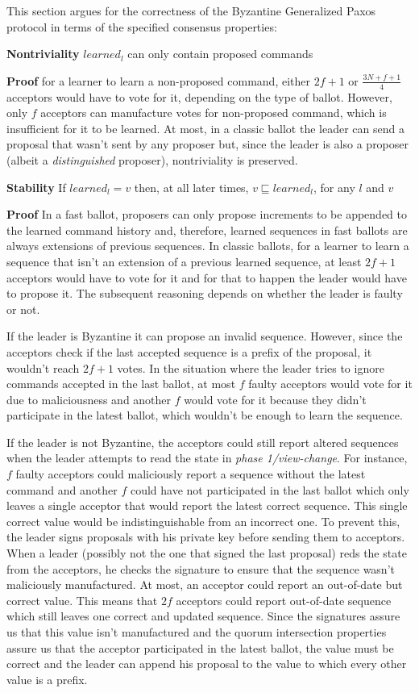 \newpage
This section argues for the correctness of the Byzantine Generalized Paxos protocol in terms of the specified consensus properties:\par

\textbf{Nontriviality} $learned_l$ can only contain proposed commands\par
\textbf{Proof} for a learner to learn a non-proposed command, either $2f+1$ or $\frac{3N+f+1}{4}$ acceptors would have to vote for it, depending on the type of ballot. However, only $f$ acceptors can manufacture votes for non-proposed command, which is insufficient for it to be learned. At most, in a classic ballot the leader can send a proposal that wasn't sent by any proposer but, since the leader is also a proposer (albeit a \textit{distinguished} proposer), nontriviality is preserved.\par

\textbf{Stability} If $learned_l = v$ then, at all later times, $v \sqsubseteq learned_l$, for any $l$ and $v$\par
\textbf{Proof} In a fast ballot, proposers can only propose increments to be appended to the learned command history and, therefore, learned sequences in fast ballots are always extensions of previous sequences. In classic ballots, for a learner to learn a sequence that isn't an extension of a previous learned sequence, at least $2f+1$ acceptors would have to vote for it and for that to happen the leader would have to propose it. The subsequent reasoning depends on whether the leader is faulty or not.\par
If the leader is Byzantine it can propose an invalid sequence. However, since the acceptors check if the last accepted sequence is a prefix of the proposal, it wouldn't reach $2f+1$ votes. In the situation where the leader tries to ignore commands accepted in the last ballot, at most $f$ faulty acceptors would vote for it due to maliciousness and another $f$ would vote for it because they didn't participate in the latest ballot, which wouldn't be enough to learn the sequence. \par
If the leader is not Byzantine, the acceptors could still report altered sequences when the leader attempts to read the state in \textit{phase 1/view-change}. For instance, $f$ faulty acceptors could maliciously report a sequence without the latest command and another $f$ could have not participated in the last ballot which only leaves a single acceptor that would report the latest correct sequence. This single correct value would be indistinguishable from an incorrect one. To prevent this, the leader signs proposals with his private key before sending them to acceptors. When a leader (possibly not the one that signed the last proposal) reds the state from the acceptors, he checks the signature to ensure that the sequence wasn't maliciously manufactured. At most, an acceptor could report an out-of-date but correct value. This means that $2f$ acceptors could report out-of-date sequence which still leaves one correct and updated sequence. Since the signatures assure us that this value isn't manufactured and the quorum intersection properties assure us that the acceptor participated in the latest ballot, the value must be correct and the leader can append his proposal to the value to which every other value is a prefix.